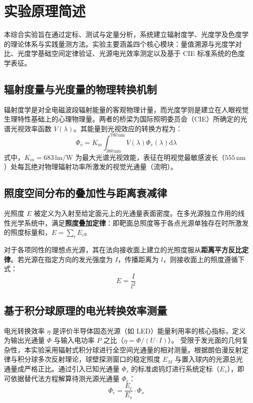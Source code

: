 \documentclass[12pt, a4paper]{article}
\begin{document}
\section{实验原理简述}

本综合实验旨在通过定标、测试与定量分析，系统建立辐射度学、光度学及色度学的理论体系与实践量测方法。实验主要涵盖四个核心模块：量值溯源与光度学对比、光度学基础空间定律验证、光源电光效率测定以及基于 CIE 标准系统的色度学表征。

\subsection{辐射度量与光度量的物理转换机制}
辐射度学是对全电磁波段辐射能量的客观物理计量，而光度学则是建立在人眼视觉生理特性基础上的心理物理量。两者的桥梁为国际照明委员会（CIE）所确定的光谱光视效率函数 $V(\lambda)$。其能量到光视效应的转换方程为：
\begin{equation}
\Phi_{v} = K_{m} \int_{380\,\mathrm{nm}}^{780\,\mathrm{nm}} V(\lambda)\Phi_{e}(\lambda)\mathrm{d}\lambda
\end{equation}
式中，$K_m = 683\,\mathrm{lm/W}$ 为最大光谱光视效能，表征在明视觉最敏感波长（$555\,\mathrm{nm}$）处每瓦绝对物理辐射功率所激发的视觉光通量（流明）。

\subsection{照度空间分布的叠加性与距离衰减律}
光照度 $E$ 被定义为入射至给定面元上的光通量表面密度。在多光源独立作用的线性光学系统中，满足\textbf{照度叠加定律}：即靶面总照度等于各点光源单独存在时所激发的照度标量和，$E = \sum_{i} E_i$。

对于各项同性的理想点光源，其在法向接收面上建立的光照度服从\textbf{距离平方反比定律}。若光源在指定方向的发光强度为 $I$，传播距离为 $l$，则接收面上的照度遵循下式：
\begin{equation}
E = \frac{I}{l^2}
\end{equation}

\subsection{基于积分球原理的电光转换效率测量}
电光转换效率 $\eta$ 是评价半导体固态光源（如 LED）能量利用率的核心指标，定义为输出光通量 $\Phi$ 与输入电功率 $P$ 之比（$\eta = \Phi / (U \cdot I)$）。
受限于发光面的几何复杂性，本实验采用辐射式积分球进行全空间光通量的相对测量。根据朗伯漫反射定律与积分球多次反射理论，球壁探测窗口的稳定照度 $E_M$ 与置入球内的光源总光通量成严格正比。通过引入已知光通量 $\Phi_s$ 的标准卤钨灯进行系统定标（$E_s$），即可依据替代法方程解算待测光源光通量 $\Phi_c$：
\begin{equation}
\Phi_{c} = \frac{E_{c}}{E_{s}} \cdot \Phi_{s}
\end{equation}
\end{document}
